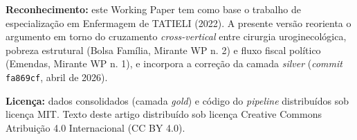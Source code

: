 \documentclass[12pt,a4paper,oneside]{article}
\begin{document}
\vspace{0.5cm}

\noindent\textbf{Reconhecimento:} este Working Paper tem como
base o trabalho de especialização em Enfermagem de TATIELI
(2022). A presente versão reorienta o argumento em torno do
cruzamento
\textit{cross-vertical} entre cirurgia uroginecológica, pobreza
estrutural (Bolsa Família, Mirante WP n. 2) e fluxo fiscal
político (Emendas, Mirante WP n. 1), e incorpora a correção da
camada \textit{silver} (\textit{commit} \texttt{fa869cf}, abril
de 2026).

\vspace{0.5cm}

\noindent\textbf{Licença:} dados consolidados (camada
\textit{gold}) e código do \textit{pipeline} distribuídos sob
licença MIT. Texto deste artigo distribuído sob licença Creative
Commons Atribuição 4.0 Internacional (CC BY 4.0).
\end{document}
